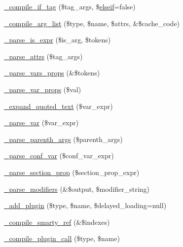 \begin{DoxyCompactItemize}
\item 
\hyperlink{class_smarty___compiler_a75459b547539c23758a5e3c8128651b0}{\-\_\-compile\-\_\-if\-\_\-tag} (\$tag\-\_\-args, \$\hyperlink{php_thumb_8demo_8check_8php_af92779326267616cd7c3cdaaa9484bc9}{elseif}=false)
\item 
\hyperlink{class_smarty___compiler_a706dfb0a042d70b407153241653da0c6}{\-\_\-compile\-\_\-arg\-\_\-list} (\$type, \$name, \$attrs, \&\$cache\-\_\-code)
\item 
\hyperlink{class_smarty___compiler_ad03b182e7b84d4a40218ae9b4f8080de}{\-\_\-parse\-\_\-is\-\_\-expr} (\$is\-\_\-arg, \$tokens)
\item 
\hyperlink{class_smarty___compiler_a226e4f37cafc2d535b3ea7ccad565d6a}{\-\_\-parse\-\_\-attrs} (\$tag\-\_\-args)
\item 
\hyperlink{class_smarty___compiler_a2ab9cbfebcdbc2807c684de842278295}{\-\_\-parse\-\_\-vars\-\_\-props} (\&\$tokens)
\item 
\hyperlink{class_smarty___compiler_a7925236cb19a53ba4fb17ff51f164eb9}{\-\_\-parse\-\_\-var\-\_\-props} (\$val)
\item 
\hyperlink{class_smarty___compiler_ad242e9af4f6ee1524acdca2ee529f87a}{\-\_\-expand\-\_\-quoted\-\_\-text} (\$var\-\_\-expr)
\item 
\hyperlink{class_smarty___compiler_aeeaa2b6e8325e1aa932d45a189e8bce6}{\-\_\-parse\-\_\-var} (\$var\-\_\-expr)
\item 
\hyperlink{class_smarty___compiler_a77a6bbc6a17e76b941c3cefeee9c7b2d}{\-\_\-parse\-\_\-parenth\-\_\-args} (\$parenth\-\_\-args)
\item 
\hyperlink{class_smarty___compiler_a3887c9771f60165babae612a4595d1fc}{\-\_\-parse\-\_\-conf\-\_\-var} (\$conf\-\_\-var\-\_\-expr)
\item 
\hyperlink{class_smarty___compiler_a4509a57efd495c63579f7447c2d28972}{\-\_\-parse\-\_\-section\-\_\-prop} (\$section\-\_\-prop\-\_\-expr)
\item 
\hyperlink{class_smarty___compiler_afd43133d5f05a358b1a76cf60805119e}{\-\_\-parse\-\_\-modifiers} (\&\$output, \$modifier\-\_\-string)
\item 
\hyperlink{class_smarty___compiler_aaaf68202b4841dc6c783be9b8911d36b}{\-\_\-add\-\_\-plugin} (\$type, \$name, \$delayed\-\_\-loading=null)
\item 
\hyperlink{class_smarty___compiler_ab320c43ef5206f5be26190264ee8e87d}{\-\_\-compile\-\_\-smarty\-\_\-ref} (\&\$indexes)
\item 
\hyperlink{class_smarty___compiler_ac9e7526111cdf46d56d1515813a26e09}{\-\_\-compile\-\_\-plugin\-\_\-call} (\$type, \$name)

\end{DoxyCompactItemize}
